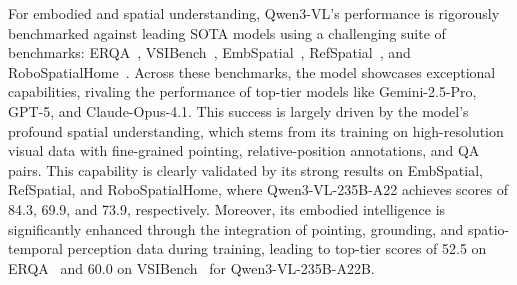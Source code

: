 For embodied and spatial understanding, Qwen3-VL's performance is rigorously benchmarked against leading SOTA models using a challenging suite of benchmarks: ERQA~\citep{team2025gemini}, VSIBench~\citep{yang2025thinking}, EmbSpatial~\citep{du2024embspatial}, RefSpatial~\citep{zhou2025roborefer}, and RoboSpatialHome~\citep{song2025robospatial}. Across these benchmarks, the model showcases exceptional capabilities, rivaling the performance of top-tier models like Gemini-2.5-Pro, GPT-5, and Claude-Opus-4.1.
This success is largely driven by the model's profound spatial understanding, which stems from its training on high-resolution visual data with fine-grained pointing, relative-position annotations, and QA pairs. This capability is clearly validated by its strong results on EmbSpatial, RefSpatial, and RoboSpatialHome, where Qwen3-VL-235B-A22 achieves scores of 84.3, 69.9, and 73.9, respectively.
Moreover, its embodied intelligence is significantly enhanced through the integration of pointing, grounding, and spatio-temporal perception data during training, leading to top-tier scores of 52.5 on ERQA~\citep{team2025gemini} and 60.0 on VSIBench~\citep{yang2025thinking} for Qwen3-VL-235B-A22B.